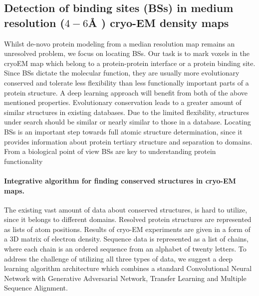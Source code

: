 \subsection{ Detection of binding sites (BSs)  in medium resolution ($4 -6 ${{\AA} } ) cryo-EM density maps}
Whilst de-novo protein modeling from a median resolution map remains an unresolved problem, we focus on locating BSs.  
Our task is to mark voxels in the cryoEM map which belong to a protein-protein interface or  a protein binding site.
Since  BSs dictate the molecular function, they are usually more evolutionary conserved and tolerate less flexibility than less functionally important parts of a protein structure. 
A deep learning approach will benefit from both of the above mentioned  properties.
Evolutionary conservation leads to a greater amount of similar structures in existing databases. 
Due to the limited flexibility, structures under search should be similar or nearly similar to those in a database. 
Locating  BSs is an important step towards full atomic structure determination, since it provides information about protein tertiary structure and separation to domains.
From a biological point of view  BSs are key to understanding protein functionality
\paragraph{Integrative algorithm for finding conserved structures in cryo-EM maps.}
The existing vast amount of data about conserved structures, is hard to utilize, since it  belongs to different domains.
Resolved protein structures are represented as lists of atom positions.
Results of cryo-EM experiments are given in a form of a 3D matrix of electron density.
Sequence data is represented as a list of chains, where each chain is an ordered sequence from an alphabet of twenty letters.  
To address the challenge of utilizing all three types of data, we suggest a deep learning algorithm architecture which combines a standard Convolutional Neural Network with Generative Adversarial Network, Transfer Learning and Multiple Sequence Alignment.
